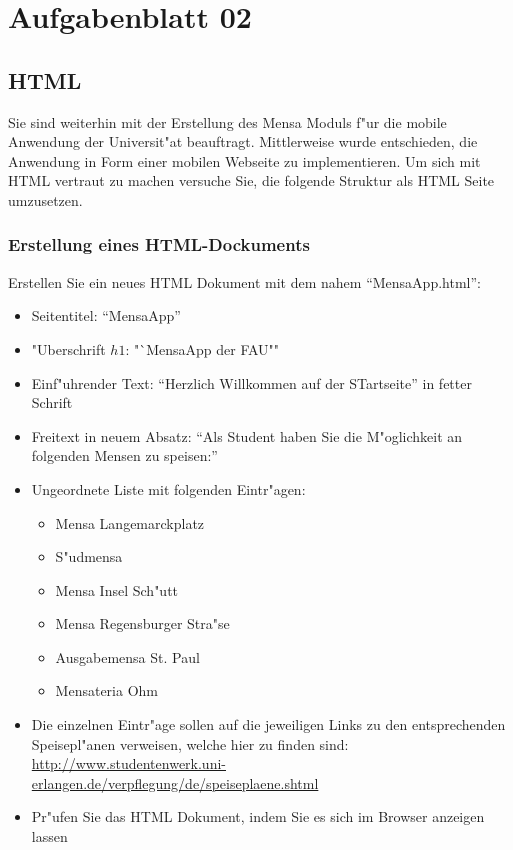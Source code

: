 
\chapter{Aufgabenblatt 02}

\section{HTML}
Sie sind weiterhin mit der Erstellung des Mensa Moduls f"ur die mobile Anwendung der Universit"at beauftragt.
Mittlerweise wurde entschieden, die Anwendung in Form einer mobilen Webseite zu implementieren.
Um sich mit HTML vertraut zu machen versuche Sie, die folgende Struktur als HTML Seite umzusetzen.

\subsection{Erstellung eines HTML-Dockuments}
Erstellen Sie ein neues HTML Dokument mit dem nahem "`MensaApp.html"':
\begin{itemize}
    \item Seitentitel: "`MensaApp"'
    \item "Uberschrift $h1$: "`MensaApp der FAU""
    \item Einf"uhrender Text: "`Herzlich Willkommen auf der STartseite"' in fetter Schrift
    \item Freitext in neuem Absatz: "`Als Student haben Sie die M"oglichkeit an folgenden Mensen zu speisen:"'
    \item Ungeordnete Liste mit folgenden Eintr"agen:
    \begin{itemize}
        \item Mensa Langemarckplatz
        \item S"udmensa
        \item Mensa Insel Sch"utt
        \item Mensa Regensburger Stra"se
        \item Ausgabemensa St. Paul
        \item Mensateria Ohm
    \end{itemize}
    \item Die einzelnen Eintr"age sollen auf die jeweiligen Links zu den entsprechenden Speisepl"anen verweisen, welche hier zu finden sind: \url{http://www.studentenwerk.uni-erlangen.de/verpflegung/de/speiseplaene.shtml}
    \item Pr"ufen Sie das HTML Dokument, indem Sie es sich im Browser anzeigen lassen
\end{itemize}

\lstset{style=customHTML}


